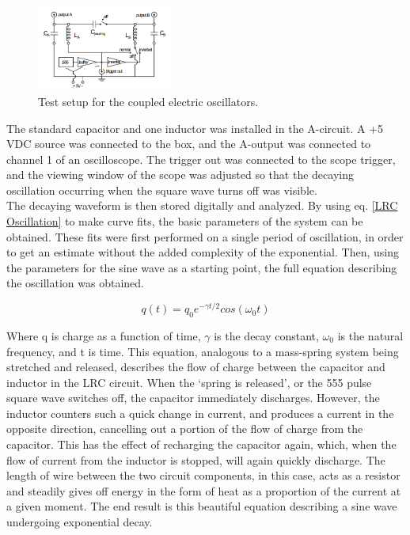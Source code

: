 \documentclass[aps,prl,reprint]{revtex4-2}
\begin{document}
\begin{figure}[h]
\includegraphics[width=0.4\textwidth]{../Images/l6_setup.png}
\caption{\label{setup} Test setup for the coupled electric oscillators.}
\end{figure}

The standard capacitor and one inductor was installed in the A-circuit. A +5 VDC source
was connected to the box, and the A-output was connected to channel 1 of an oscilloscope.
The trigger out was connected to the scope trigger, and the viewing window of the scope
was adjusted so that the decaying oscillation occurring when the square wave turns off
was visible. \\

The decaying waveform is then stored digitally and analyzed. By using eq. 
\ref{LRC Oscillation} to make curve fits, the basic parameters of the system
can be obtained. These fits were first performed on a single period of oscillation,
in order to get an estimate without the added complexity of the exponential. Then,
using the parameters for the sine wave as a starting point, the full equation describing
the oscillation was obtained.

\begin{equation} 
q(t) = q_{0}e^{-\gamma t/2}cos(\omega_0t)
\label{LRC Oscillation}
\end{equation}

Where q is charge as a function of time, $\gamma$ is the decay constant,
$\omega_0$ is the natural frequency, and t is time. This equation,
analogous to a mass-spring system being stretched and released,
describes the flow of charge between the capacitor and inductor in
the LRC circuit. When the `spring is released', or the 555 pulse
square wave switches off, the capacitor immediately discharges.
However, the inductor counters such a quick change in current,
and produces a current in the opposite direction, cancelling out a
portion of the flow of charge from the capacitor. This has the 
effect of recharging the capacitor again, which, when the flow
of current from the inductor is stopped, will again quickly
discharge. The length of wire between the two circuit components,
in this case, acts as a resistor and steadily gives off energy
in the form of heat as a proportion of the current at a given
moment. The end result is this beautiful equation 
describing a sine wave undergoing exponential decay. \\
\end{document}
